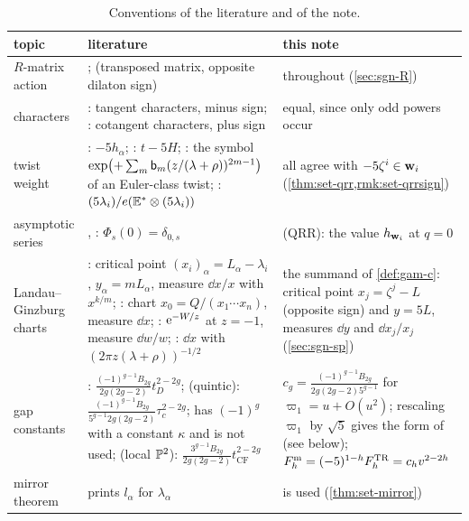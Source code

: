 \begin{table}[ht]
\caption{Conventions of the literature and of the note.}
\label{tab:sgn-lit}
\centering
\footnotesize
\renewcommand{\arraystretch}{1.2}
\begin{tabular}{@{}>{\raggedright\arraybackslash}p{}>{\raggedright\arraybackslash}p{}>{\raggedright\arraybackslash}p{}@{}}
\hline
topic & literature & this note \\
\hline
$R$-matrix action & \cite[Def.~2.2]{PPZ15}; \cite[\S2.3]{Dunin-Barkowski:2015caa} (transposed matrix, opposite dilaton sign) & \cite{PPZ15} throughout (\cref{sec:sgn-R}) \\
characters & \cite[\S2.2, Theorem~1]{Giv01}: tangent characters, minus sign; \cite[9.1~Theorem]{MR1901075}: cotangent characters, plus sign & equal, since only odd powers occur \\
twist weight & \cite[(17)]{GJR18}: $-5h_\alpha$; \cite[(20)]{GJR17}: $t-5H$; \cite[Corollary~1]{MR2276766}: the symbol $\exp\bigl(+\sum_m\mathsf{b}_m(z/(\lambda+\rho))^{2m-1}\bigr)$ of an Euler-class twist; \cite[(26)]{LP20}: $(5\lambda_i)/e(\mathbb E^*\otimes(5\lambda_i))$ & all agree with $-5\zeta^i\in\mathbf{w}_i$ (\cref{thm:set-qrr,rmk:set-qrrsign}) \\
asymptotic series & \cite[Theorem~4 (i)]{ZZ08}, \cite[\S2.4.4, (18)]{LP20}: $\Phi_s(0)=\delta_{0,s}$ & (QRR): the value $h_{\mathbf{w}_i}$ at $q=0$ \\
Landau--Ginzburg charts & \cite[\S7, Remark~7.2]{GJR18}: critical point $(x_i)_\alpha=L_\alpha-\lambda_i$, $y_\alpha=mL_\alpha$, measure $\dd x/x$ with $x^{k/m}$; \cite[\S10]{MR1901075}: chart $x_0=Q/(x_1\cdots x_n)$, measure $\dd x$; \cite[Lemma~4.20]{MR2553377}: $\mathrm{e}^{-W/z}$ at $z=-1$, measure $\dd w/w$; \cite[\S7, (11)]{MR2276766}: $\dd x$ with $(2\pi z(\lambda+\rho))^{-1/2}$ & the summand of \cref{def:gam-c}: critical point $x_j=\zeta^j-L$ (opposite sign) and $y=5L$, measures $\dd y$ and $\dd x_j/x_j$ (\cref{sec:sgn-sp}) \\
gap constants & \cite[(1.2)]{HKQ09}: $\frac{(-1)^{g-1}B_{2g}}{2g(2g-2)}t_D^{2-2g}$; \cite[Conjecture~1.5]{CGYZ26} (quintic): $\frac{(-1)^{g-1}B_{2g}}{5^{g-1}2g(2g-2)}\tau_c^{2-2g}$; \cite[Definition~1.8]{CGYZ26} has $(-1)^g$ with a constant $\kappa$ and is not used; \cite[(1.5)]{Br25} (local $\mathbb{P}^2$): $\frac{3^{g-1}B_{2g}}{2g(2g-2)}t_{\mathrm{CF}}^{2-2g}$ & $c_g=\frac{(-1)^{g-1}B_{2g}}{2g(2g-2)5^{g-1}}$ for $\varpi_1=u+O(u^2)$; rescaling $\varpi_1$ by $\sqrt5$ gives the form of \cite[(1.2)]{HKQ09} (see below); $F^{\mathrm{m}}_h=(-5)^{1-h}F^{\mathrm{TR}}_h=c_hv^{2-2h}$ \\
mirror theorem & \cite[Corollary~11.7]{MR1408320} prints $l_\alpha$ for $\lambda_\alpha$ & \cite[Theorem~11.6]{MR1408320} is used (\cref{thm:set-mirror}) \\
\hline
\end{tabular}
\end{table}

